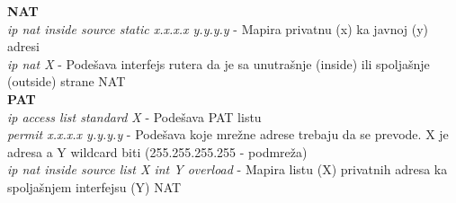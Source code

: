 \textbf{NAT}\\
\textit{ip nat inside source static x.x.x.x y.y.y.y} - Mapira privatnu (x) ka javnoj (y) adresi\\
\textit{ip nat X} - Podešava interfejs rutera da je sa unutrašnje (inside) ili spoljašnje (outside) strane NAT\\

\textbf{PAT}\\
\textit{ip access list standard X} - Podešava PAT listu\\
\textit{permit x.x.x.x y.y.y.y} - Podešava koje mrežne adrese trebaju da se prevode. X je adresa a Y wildcard biti (255.255.255.255 - podmreža)\\
\textit{ip nat inside source list X int Y overload} - Mapira listu (X) privatnih adresa ka spoljašnjem interfejsu (Y) NAT\\